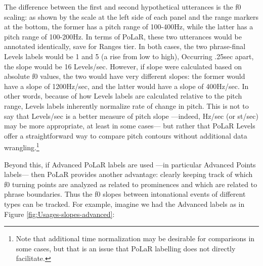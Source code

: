 \documentclass[11pt, twoside]{memoir}
\begin{document}
The difference between the first and second hypothetical utterances is the f0 scaling: as shown by the scale at the left side of each panel and the range markers at the bottom, the former has a pitch range of 100-400Hz, while the latter has a pitch range of 100-200Hz. In terms of PoLaR, these two utterances would be annotated identically, save for Ranges tier. In both cases, the two phrase-final Levels labels would be 1 and 5 (a rise from low to high), Occurring .25sec apart, the slope would be 16 Levels/sec. However, if slope were calculated based on absolute f0 values, the two would have very different slopes: the former would have a slope of 1200Hz/sec, and the latter would have a slope of 400Hz/sec. In other words, because of how Levels labels are calculated relative to the pitch range, Levels labels inherently normalize rate of change in pitch. This is not to say that Levels/sec is a better measure of pitch slope —indeed, Hz/sec (or st/sec) may be more appropriate, at least in some cases— but rather that PoLaR Levels offer a straightforward way to compare pitch contours without additional data wrangling.\footnote{Note that additional time normalization may be desirable for comparisons in some cases, but that is an issue that PoLaR labelling does not directly facilitate.}

Beyond this, if Advanced PoLaR labels are used —in particular Advanced Points labels— then PoLaR provides another advantage: clearly keeping track of which f0 turning points are analyzed as related to prominences and which are related to phrase boundaries. Thus the f0 slopes between intonational events of different types can be tracked. For example, imagine we had the Advanced labels as in Figure \ref{fig:Usages-slopes-advanced}:
\end{document}
